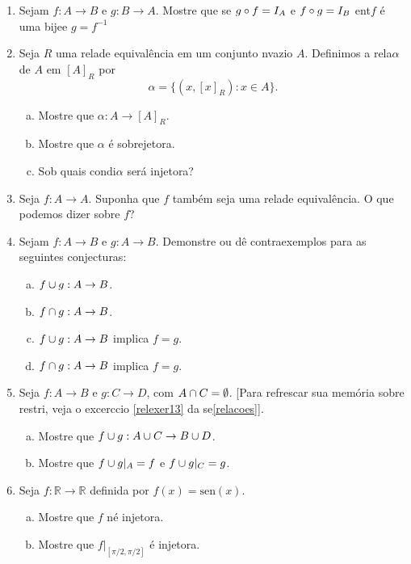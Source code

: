 \begin{enumerate}[{\bf 1.}]
\item Sejam $f:A\to B$ e $g:B\to A$. Mostre que se $g\circ f=I_A$ e $f\circ g=I_B$ ent\ao $f$ \'e uma bije\cao e $g=f^{-1}$

\item Seja $R$ uma rela\cao de equival\^encia em um conjunto n\ao vazio $A$. Definimos a rela\cao $\alpha$ de $A$ em $[A]_R$ por
\[
\alpha=\{(x,[x]_R): x\in A\}.
\]
\begin{enumerate}[a)]
\item Mostre que $\alpha:A\to [A]_R$.
\item Mostre que $\alpha$ \'e sobrejetora.
\item Sob quais condi\coes $\alpha$ ser\'a injetora?
\end{enumerate}

\item Seja $f:A\to A$. Suponha que $f$ tamb\'em seja uma rela\cao de equival\^encia. O que podemos dizer sobre $f$? 

\item Sejam $f:A\to B$ e $g:A\to B$. Demonstre ou d\^e contraexemplos para as seguintes conjecturas:
\begin{enumerate}[a)]
\item $f\cup g:A\to B$.
\item $f\cap g:A\to B$.
\item $f\cup g:A\to B$ implica $f=g$.
\item $f\cap g:A\to B$ implica $f=g$.
\end{enumerate}

\item Seja $f:A\to B$ e $g:C\to D$, com $A\cap C=\emptyset$. [Para refrescar sua mem\'oria sobre restri\cois, veja o excerc\ih cio \ref{relexer13} da se\cao \ref{relacoes}]. 
\begin{enumerate}[a)]
\item Mostre que $f\cup g:A\cup C\to B\cup D$.
\item Mostre que $f\cup g|_A=f$ e $f\cup g|_C=g$. 
\end{enumerate}

\item Seja $f:\mathbb{R}\to\mathbb{R}$ definida por $f(x)=\textrm{sen}(x).$
\begin{enumerate}[a)]
\item Mostre que $f$ n\ao \'e injetora.
\item Mostre que $f|_{[\pi/2,\pi/2]}$ \'e injetora.
\end{enumerate}


\end{enumerate}
